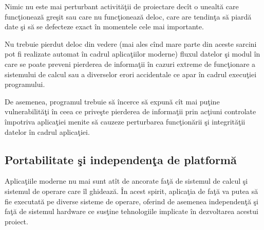 Nimic nu este mai perturbant activităţii de proiectare decît o unealtă care
funcţionează greşit sau care nu funcţionează deloc, care are tendinţa să piardă
date şi să se defecteze exact în momentele cele mai importante.

Nu trebuie pierdut deloc din vedere (mai ales cînd mare parte din aceste sarcini
pot fi realizate automat în cadrul aplicaţiilor moderne) fluxul datelor şi modul
în care se poate preveni pierderea de informaţii în cazuri extreme de
funcţionare a sistemului de calcul sau a diverselor erori accidentale ce apar în
cadrul execuţiei programului.

De asemenea, programul trebuie să încerce să expună cît mai puţine
vulnerabilităţi în ceea ce priveşte pierderea de informaţii prin acţiuni
controlate împotriva aplicaţiei menite să cauzeze perturbarea funcţionării şi
integrităţii datelor în cadrul aplicaţiei.

\subsection{Portabilitate şi independenţa de platformă}

Aplicaţiile moderne nu mai sunt atît de ancorate faţă de sistemul de calcul şi
sistemul de operare care îl ghidează. În acest spirit, aplicaţia de faţă va
putea să fie executată pe diverse sisteme de operare, oferind de asemenea
independenţă şi faţă de sistemul hardware ce susţine tehnologiile implicate în
dezvoltarea acestui proiect.
